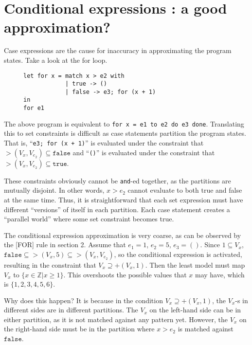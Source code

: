 \documentclass{article}
\newcommand\vbar{|}
\begin{document}
\section{Conditional expressions : a good approximation?}

Case expressions are the cause for inaccuracy in approximating the program states. Take a look at the for loop.
\begin{figure}[htb]
\centering
\begin{BVerbatim}
let for x = match x > e2 with
            | true -> ()
            | false -> e3; for (x + 1)
in
for e1
\end{BVerbatim}
\end{figure}

The above program is equivalent to \texttt{for x = e1 to e2 do e3 done}. Translating this to set constraints is difficult as case statements partition the program states.
That is, ``\texttt{e3; for (x + 1)}'' is evaluated under the constraint that $>(V_{x},V_{e_{2}})\subseteq \mathtt{false}$ and ``\texttt{()}'' is evaluated under the constraint that $>(V_{x}, V_{e_{2}})\subseteq \mathtt{true}$.

These constraints obviously cannot be \texttt{and}-ed together, as the partitions are mutually disjoint. In other words, $x > e_{2}$ cannot evaluate to both true and false at the same time. Thus, it is straightforward that each set expression must have different ``versions'' of itself in each partition. Each case statement creates a ``parallel world'' where some set constraint becomes true.

The conditional expression approximation is very coarse, as can be observed by the [FOR] rule in section 2. Assume that $e_{1}=1$, $e_{2}=5$, $e_{3}=()$. Since $1\subseteq V_{x}$, $\mathtt{false}\subseteq >(V_{x}, 5)\subseteq >(V_{x}, V_{e_{2}})$, so the conditional expression is activated, resulting in the constraint that $V_{x}\supseteq +(V_{x}, 1)$. Then the least model must map $V_{x}$ to $\{x\in\mathbb{Z}\vbar x \ge 1\}$. This overshoots the possible values that $x$ may have, which is $\{1, 2, 3, 4, 5, 6\}$.

Why does this happen? It is because in the condition $V_{x}\supseteq +(V_{x}, 1)$, the $V_{x}$-s in different sides are in different partitions. The $V_{x}$ on the left-hand side can be in either partition, as it is not matched against any pattern yet. However, the $V_{x}$ on the right-hand side must be in the partition where $x>e_{2}$ is matched against $\mathtt{false}$.
\end{document}
